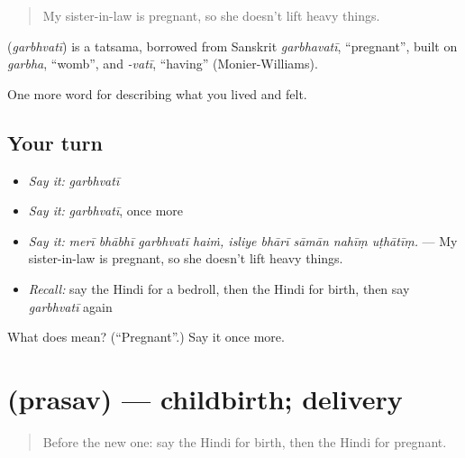 \begin{quote}
My sister-in-law is pregnant, so she doesn't lift heavy things.
\end{quote}

\begin{cousinweb}
\textbf{} (\emph{garbhvatī}) is a tatsama, borrowed from Sanskrit \emph{garbhavatī}, \textquotedblleft{}pregnant\textquotedblright{}, built on \emph{garbha}, \textquotedblleft{}womb\textquotedblright{}, and \emph{-vatī}, \textquotedblleft{}having\textquotedblright{} (Monier-Williams).
\end{cousinweb}

\begin{grammarlens}[title={What you've built}]
One more word for describing what you lived and felt.
\end{grammarlens}

\subsection*{Your turn}
\begin{itemize}
\raggedright
  \item \emph{Say it:} \emph{garbhvatī}
  \item \emph{Say it:} \emph{garbhvatī}, once more
  \item \emph{Say it:} \emph{merī bhābhī garbhvatī haiṁ, isliye bhārī sāmān nahīṃ uṭhātīṃ.} — My sister-in-law is pregnant, so she doesn't lift heavy things.
  \item \emph{Recall:} say the Hindi for a bedroll, then the Hindi for birth, then say \emph{garbhvatī} again
\end{itemize}

\begin{tcolorbox}[breakable,colback=teal!4,colframe=teal!35!black,title={Before you move on}]
What does  mean? (\textquotedblleft{}Pregnant\textquotedblright{}.) Say it once more.
\end{tcolorbox}
\section[\texorpdfstring{\hi{प्रसव} (prasav)}{प्रसव (prasav)}]{ (prasav) — childbirth; delivery}

\label{lesson:HI-C497-prasav}



\begin{quote}
Before the new one: say the Hindi for birth, then the Hindi for pregnant.
\end{quote}

